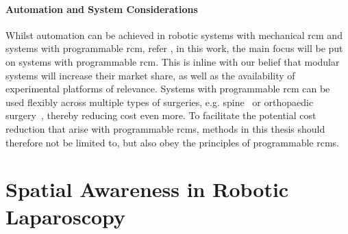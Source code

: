 \paragraph{Automation and System Considerations} Whilst automation can be achieved in robotic systems with mechanical \gls{rcm} and systems with programmable \gls{rcm}, refer , in this work, the main focus will be put on systems with programmable \gls{rcm}. This is inline with our belief that modular systems will increase their market share, as well as the availability of experimental platforms of relevance. Systems with programmable \gls{rcm} can be used flexibly across multiple types of surgeries, e.g. spine~\cite{farber2021robotics} or orthopaedic surgery~\cite{suarez2023revolutionizing}, thereby reducing cost even more. To facilitate the potential cost reduction that arise with programmable \gls{rcm}s, methods in this thesis should therefore not be limited to, but also obey the principles of programmable \gls{rcm}s. 














\section{Spatial Awareness in Robotic Laparoscopy}
\label{in:sec:spatial_awareness_in_robotic_laparoscopy} 

